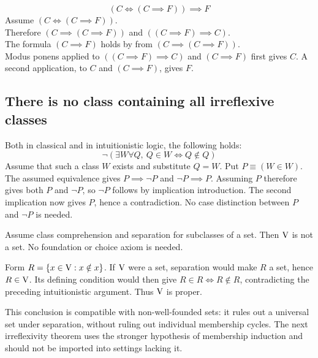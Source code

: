 \begin{theorem}
\label{Curry's Paradox}
\[
(C\iff (C\implies F))\implies F
\]
\Proof
Assume $(C\iff (C\implies F))$.\\
Therefore $(C\implies (C\implies F))$ and $((C\implies F)\implies C)$.\\
The formula $(C\implies F)$ holds by  from $(C\implies (C\implies F))$.\\
Modus ponens applied to $((C\implies F)\implies C)$ and $(C\implies F)$
first gives $C$. A second application, to $C$ and $(C\implies F)$, gives $F$.
\Done
\end{theorem}

\subsection{There is no class containing all irreflexive classes}
\begin{theorem}
\label{Russel's Paradox}
Both in classical and in intuitionistic logic, the following holds:
\[
\neg (\exists W \forall Q,\  Q\in W \iff Q\notin Q)
\]
\Proof
Assume that such a class $W$ exists and substitute $Q=W$. Put
$P\equiv(W\in W)$. The assumed equivalence gives $P\implies\neg P$
and $\neg P\implies P$. Assuming $P$ therefore gives both $P$ and
$\neg P$, so $\neg P$ follows by implication introduction. The second
implication now gives $P$, hence a contradiction. No case distinction
between $P$ and $\neg P$ is needed.
\Done
\end{theorem}
\begin{theorem}
\label{thm:V_proper_separation}
Assume class comprehension and separation for subclasses of a set.
Then $\mathrm{V}$ is not a set. No foundation or choice axiom is needed.
\end{theorem}
\Proof
Form $R=\{x\in\mathrm{V}:x\notin x\}$. If $\mathrm{V}$ were a set, separation
would make $R$ a set, hence $R\in\mathrm{V}$. Its defining condition would
then give $R\in R\iff R\notin R$, contradicting the preceding
intuitionistic argument. Thus $\mathrm{V}$ is proper.
\Done

This conclusion is compatible with non-well-founded sets: it rules out
a universal set under separation, without ruling out individual membership
cycles. The next irreflexivity theorem uses the stronger hypothesis of
membership induction and should not be imported into settings lacking it.

